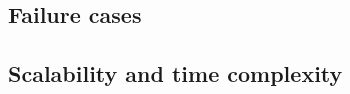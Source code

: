 
\subsection{\textcolor{petr}{Failure cases}}
\textcolor{petr}{
  
}

\subsection{\textcolor{petr}{Scalability and time complexity}}
\textcolor{petr}{
  
}

